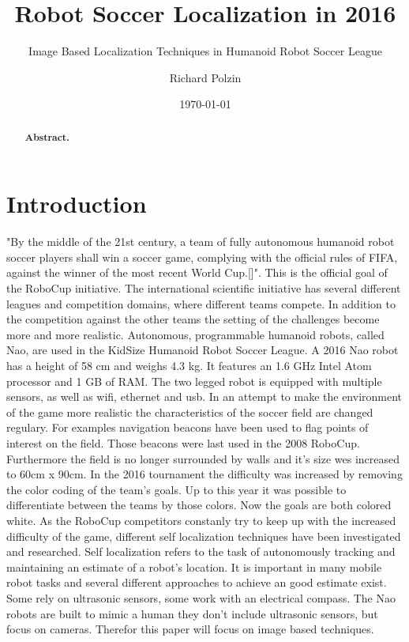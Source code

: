 \documentclass[12pt, a4paper]{scrartcl}
\author{Richard Polzin}
\title{Robot Soccer Localization in 2016}
\subtitle{Image Based Localization Techniques in Humanoid Robot Soccer League}
\date{\today}
\begin{document}
  \maketitle

  \begin{abstract}
    \textbf{Abstract.}
  \end{abstract}

  \section{Introduction}
  "By the middle of the 21st century, a team of fully autonomous humanoid robot soccer players shall win a soccer game, complying with the official rules of FIFA, against the winner of the most recent World Cup.[]". This is the official goal of the RoboCup initiative. The international scientific initiative has several different leagues and competition domains, where different teams compete. In addition to the competition against the other teams the setting of the challenges become more and more realistic. Autonomous, programmable humanoid robots, called Nao, are used in the KidSize Humanoid Robot Soccer League. A 2016 Nao robot has a height of 58 cm and weighs 4.3 kg. It features an 1.6 GHz Intel Atom processor and 1 GB of RAM. The two legged robot is equipped with multiple sensors, as well as wifi, ethernet and usb.
  In an attempt to make the environment of the game more realistic the characteristics of the soccer field are changed regulary. For examples navigation beacons have been used to flag points of interest on the field. Those beacons were last used in the 2008 RoboCup. Furthermore the field is no longer surrounded by walls and it's size wes increased to 60cm x 90cm. In the 2016 tournament the difficulty was increased by removing the color coding of the team's goals. Up to this year it was possible to differentiate between the teams by those colors. Now the goals are both colored white.
  As the RoboCup competitors constanly try to keep up with the increased difficulty of the game, different self localization techniques have been investigated and researched. Self localization refers to the task of autonomously tracking and maintaining an estimate of a robot's location. It is important in many mobile robot tasks and several different approaches to achieve an good estimate exist. Some rely on ultrasonic sensors, some work with an electrical compass. The Nao robots are built to mimic a human they don't include ultrasonic sensors, but focus on cameras. Therefor this paper will focus on image based techniques.
\end{document}
